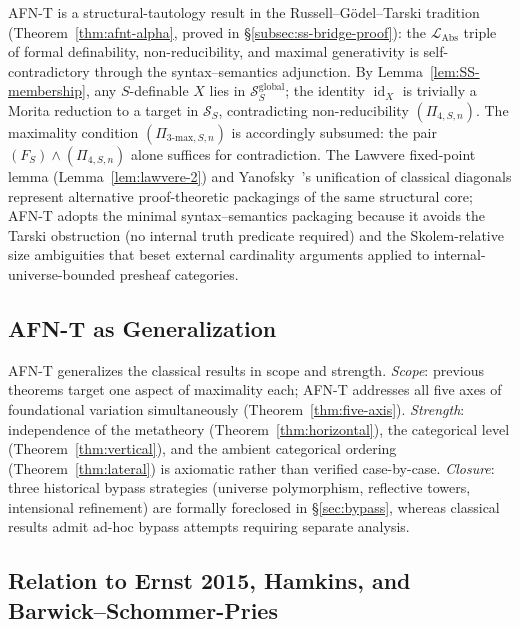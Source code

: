 \documentclass[11pt]{article}
\theoremstyle{plain}
\theoremstyle{definition}
\newcommand{\cS}{\mathcal{S}}
\newcommand{\LAbs}{\mathcal{L}_{\mathrm{Abs}}}
\DeclareMathOperator{\id}{id}
\begin{document}
AFN-T is a structural-tautology result in the Russell--Gödel--Tarski tradition (Theorem~\ref{thm:afnt-alpha}, proved in \S\ref{subsec:ss-bridge-proof}): the $\LAbs$ triple of formal definability, non-reducibility, and maximal generativity is self-contradictory through the syntax--semantics adjunction. By Lemma~\ref{lem:SS-membership}, any $S$-definable $X$ lies in $\cS_S^{\mathrm{global}}$; the identity $\id_X$ is trivially a Morita reduction to a target in $\cS_S$, contradicting non-reducibility $(\Pi_{4, S, n})$. The maximality condition $(\Pi_{3\text{-max}, S, n})$ is accordingly subsumed: the pair $(F_S) \wedge (\Pi_{4, S, n})$ alone suffices for contradiction. The Lawvere fixed-point lemma (Lemma~\ref{lem:lawvere-2}) and Yanofsky~\cite{Yanofsky2003}'s unification of classical diagonals represent alternative proof-theoretic packagings of the same structural core; AFN-T adopts the minimal syntax--semantics packaging because it avoids the Tarski obstruction (no internal truth predicate required) and the Skolem-relative size ambiguities that beset external cardinality arguments applied to internal-universe-bounded presheaf categories.

\subsection{AFN-T as Generalization}

AFN-T generalizes the classical results in scope and strength. \emph{Scope}: previous theorems target one aspect of maximality each; AFN-T addresses all five axes of foundational variation simultaneously (Theorem~\ref{thm:five-axis}). \emph{Strength}: independence of the metatheory (Theorem~\ref{thm:horizontal}), the categorical level (Theorem~\ref{thm:vertical}), and the ambient categorical ordering (Theorem~\ref{thm:lateral}) is axiomatic rather than verified case-by-case. \emph{Closure}: three historical bypass strategies (universe polymorphism, reflective towers, intensional refinement) are formally foreclosed in \S\ref{sec:bypass}, whereas classical results admit ad-hoc bypass attempts requiring separate analysis.

\subsection{Relation to Ernst 2015, Hamkins, and Barwick--Schommer-Pries}\label{sec:ernst-multiverse}
\end{document}
